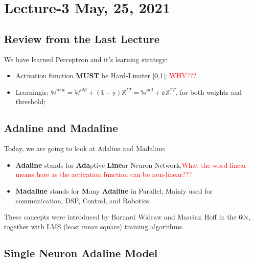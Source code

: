 \theoremstyle{definition}
\newtheorem{definition}{Definition}[section]

\chapter{Lecture-3 May, 25, 2021}

\section{Review from the Last Lecture}
We have learned Perceptron and it's learning strategy:
\begin{itemize}
    \item Activation function \textbf{MUST} be Hard-Limiter [0,1]; \textcolor{red}{WHY???}
    \item Learningis: $\mathbb{W}_{}^{new} = {\mathbb{W}^{old}} + (\mathbb{t} - \mathbb{y}){\mathbb{X}^{*T}} = {\mathbb{W}^{old}} + {\mathbb{e}_{}}\mathbb{X}_{}^{*T}$, for both weights and threshold;
\end{itemize}
\noindent{\color{red} \rule{\linewidth}{0.5mm}}
\section{Adaline and Madaline}
Today, we are going to look at Adaline and Madaline:
\begin{itemize}
    \item \textbf{Adaline} stands for \textbf{Ada}ptive \textbf{Line}ar Neuron Network;\textcolor{red}{What the word linear means here as the activation function can be non-linear???}
    \item \textbf{Madaline} stands for \textbf{M}any \textbf{Adaline} in Parallel; Mainly used for communication, DSP, Control, and Robotics.
\end{itemize}
These concepts were introduced by Barnard Widraw and Marcian Hoff in the 60s, together with LMS (least mean square) training algorithms. 

\noindent{\color{red} \rule{\linewidth}{0.5mm}}
\section{Single Neuron Adaline Model}

